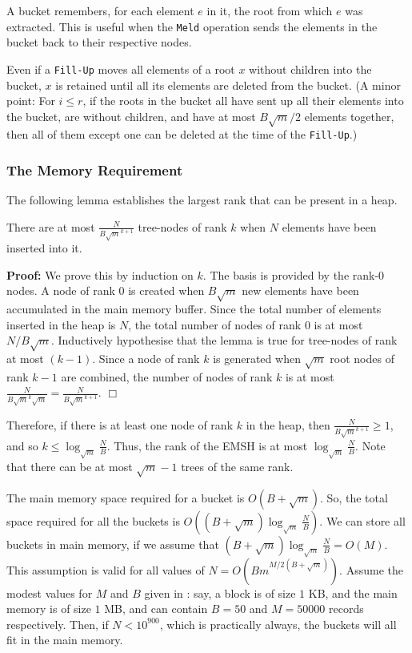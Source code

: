 A bucket remembers, for each element $e$ in it, the root from which $e$ was extracted. 
This is useful when the {\tt Meld} operation sends the elements in the bucket back to their
respective nodes. 

Even if a {\tt Fill-Up} moves all elements of a root $x$ without children into the bucket,
	$x$ is retained	until all its elements are deleted from the bucket. 
(A minor point: For $i\leq r$, if the roots in the bucket all have sent up all their
	elements into the bucket, are without children, and have at most
	$B\sqrt{m}/2$ elements together, then all of them except one can be deleted at the time
	of the {\tt Fill-Up}.)

\subsubsection{The Memory Requirement}
\label{memory:requirement}
The following lemma establishes the largest rank that can be present in a 
	heap.
\begin{lemma}
\label{lem:nodesofarank}
There are at most $\frac{N}{B\sqrt{m}^{k+1}}$ tree-nodes of rank $k$ when $N$ elements have been 
inserted into it.
\end{lemma}
{\bf Proof:}
We prove this by induction on $k$.
The basis is provided by the rank-$0$ nodes.
A node of rank $0$ is created when $B\sqrt{m}$ new elements have been accumulated in 
	the main memory buffer. 
Since the total number of elements inserted in the heap is $N$, 
	the total number of nodes of rank $0$ is at most $N/B\sqrt{m}$. 
Inductively hypothesise that the lemma is true for tree-nodes of
	rank at most $(k-1)$. 
Since a node of rank $k$ is generated when
	$\sqrt{m}$ root nodes of rank $k-1$ are combined, the number of 
	nodes of rank $k$ is at most
	$\frac{N}{B\sqrt{m}^{k}\sqrt{m}}=\frac{N}{B\sqrt{m}^{k+1}}$.
\hfill ${\Box}$

Therefore, if there is at least one node of rank $k$ in the heap, then 
$\frac{N}{B\sqrt{m}^{k+1}} \geq 1$, and so $k\leq \log_{\sqrt{m}}\frac{N}{B}$.
Thus, the rank of the EMSH is at most $\log_{\sqrt{m}} \frac{N}{B}$.
Note that there can be at most $\sqrt{m}-1$ trees of the same rank.

The main memory space required for a bucket is $O(B+\sqrt{m})$.
So, the total space required for all the buckets is
        $O((B+\sqrt{m}) \log_{\sqrt{m}} \frac{N}{B})$.
We can store all buckets in main memory, if we assume that
        $(B+\sqrt{m}) \log_{\sqrt{m}} \frac{N}{B} = O(M)$.
This assumption is valid for all values of $N=O(Bm^{M/2(B+\sqrt{m})})$.
Assume the modest values for $M$ and $B$ given in \cite{MR99}: say, a block is of size $1$ KB, and the main
	memory is of size $1$ MB, and can contain $B=50$ and $M=50000$ records respectively.
Then, if $N<10^{900}$, which is practically always, the buckets will all fit in the main memory.

